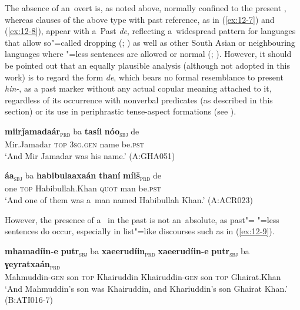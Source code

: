 The absence of an~overt  is, as noted above, normally confined to the present , whereas clauses of the above type with past  reference, as in (\ref{ex:12-7}) and (\ref{ex:12-8}), appear with a~Past   \textit{de}, reflecting a~widespread pattern for languages that allow so"=called  dropping (\citealt[34]{pustet2003}; \citealt[120]{givon2001a}) as well as other South Asian or neighbouring languages where "=less sentences are allowed or normal (\citealt[339]{masica1991}; \citealt[121]{baart1999a}). However, it should be pointed out that an equally plausible analysis (although not adopted in this work) is to regard the form \textit{de}, which bears no formal resemblance to present  \textit{hin-}, as a past  marker without any actual copular meaning attached to it, regardless of its occurrence with nonverbal predicates (as described in this section) or its  use in periphrastic tense-aspect formations (see ). 

\begin{exe}
\ex
\label{ex:12-7}
\gll {\ob}\textbf{miirǰamadaár}{\cb}\textsubscript{\textsc{\upshape prd}} ba {\ob}\textbf{tasíi} \textbf{nóo}{\cb}\textsubscript{\textsc{\upshape sbj}} de\\
Mir.Jamadar \textsc{top} \textsc{3sg.gen} name be.\textsc{pst}\\
\glt `And Mir Jamadar was his name.' (A:GHA051)
\end{exe}
\begin{exe}
\ex
\label{ex:12-8}
\gll {\ob}\textbf{áa}{\cb}\textsubscript{\textsc{\upshape sbj}} ba {\ob}\textbf{habibulaaxaán} \textbf{thaní} \textbf{míiš}{\cb}\textsubscript{\textsc{\upshape prd}} de\\
one \textsc{top} Habibullah.Khan \textsc{quot} man be.\textsc{pst}\\
\glt `And one of them was a~man named Habibullah Khan.' (A:ACR023)
\end{exe}

However, the presence of a~ in the past  is not an~absolute, as past"= "=less sentences do occur, especially in list"=like discourses such as in (\ref{ex:12-9}).

\begin{exe}
\ex
\label{ex:12-9}
\gll {\ob}\textbf{mhamadíin-e} \textbf{putr}{\cb}\textsubscript{\textsc{\upshape sbj}} ba {\ob}\textbf{xaeerudíin}{\cb}\textsubscript{\textsc{\upshape prd}} {\ob}\textbf{xaeerudíin-e} \textbf{putr}{\cb}\textsubscript{\textsc{\upshape sbj}} ba {\ob}\textbf{ɣeyratxaán}{\cb}\textsubscript{\textsc{\upshape prd}} \\
Mahmuddin-\textsc{gen} son \textsc{top} Khairuddin Khairuddin-\textsc{gen} son \textsc{top} Ghairat.Khan \\
\glt `And Mahmuddin's son was Khairuddin, and Khariuddin's son Ghairat Khan.' (B:ATI016-7)
\end{exe}

